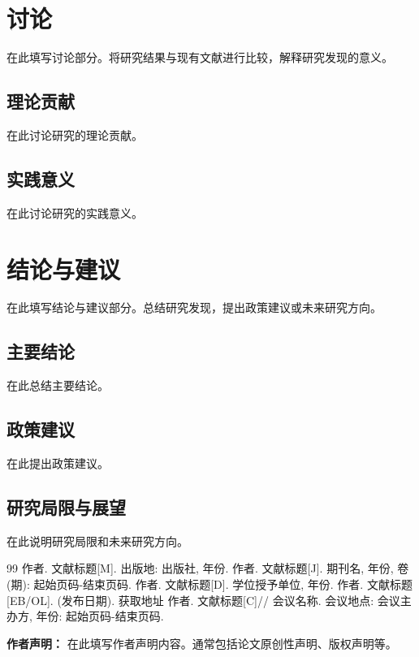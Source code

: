 \documentclass[hyperref,a4paper,UTF8]{ctexart}
\begin{document}

\section{讨论}

在此填写讨论部分。将研究结果与现有文献进行比较，解释研究发现的意义。

\subsection{理论贡献}

在此讨论研究的理论贡献。

\subsection{实践意义}

在此讨论研究的实践意义。

\section{结论与建议}

在此填写结论与建议部分。总结研究发现，提出政策建议或未来研究方向。

\subsection{主要结论}

在此总结主要结论。

\subsection{政策建议}

在此提出政策建议。

\subsection{研究局限与展望}

在此说明研究局限和未来研究方向。


\newpage
\begin{thebibliography}{99}
 作者. 文献标题[M]. 出版地: 出版社, 年份.
 作者. 文献标题[J]. 期刊名, 年份, 卷(期): 起始页码-结束页码.
 作者. 文献标题[D]. 学位授予单位, 年份.
 作者. 文献标题[EB/OL]. (发布日期). 获取地址
 作者. 文献标题[C]// 会议名称. 会议地点: 会议主办方, 年份: 起始页码-结束页码.
\end{thebibliography}


\vspace{2cm}
\noindent\textbf{作者声明：} 在此填写作者声明内容。通常包括论文原创性声明、版权声明等。
\end{document}
